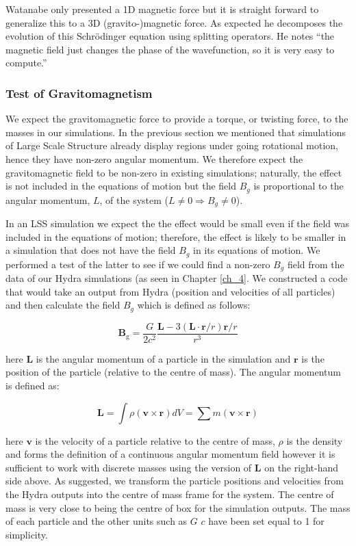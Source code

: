 Watanabe only presented a 1D magnetic force but it is straight forward to generalize this to a 3D (gravito-)magnetic force. As expected he decomposes the evolution of this Schr\"odinger equation using splitting operators. He notes ``the magnetic field just changes the phase of the wavefunction, so it is very easy to compute.''

\subsubsection{Test of Gravitomagnetism}
We expect the gravitomagnetic force to provide a torque, or twisting force, to the masses in our simulations. In the previous section we mentioned that simulations of Large Scale Structure already display regions under going rotational motion, hence they have non-zero angular momentum. We therefore expect the gravitomagnetic field to be non-zero in existing simulations; naturally, the effect is not included in the equations of motion but the field $B_g$ is proportional to the angular momentum, $L$, of the system ($L\neq 0 \Rightarrow B_g \neq 0$).

In an LSS simulation we expect the the effect would be small even if the field was included in the equations of motion; therefore, the effect is likely to be smaller in a simulation that does not have the field $B_g$ in its equations of motion. We performed a test of the latter to see if we could find a non-zero $B_g$ field from the data of our Hydra simulations (as seen in Chapter \ref{ch_4}. We constructed a code that would take an output from Hydra (position and velocities of all particles) and then calculate the field $B_g$ which is defined as follows:

\begin{equation}
\mathbf{B}_\text{g} = \frac{G }{2 c^2} \frac{\mathbf{L} - 3(\mathbf{L} \cdot \mathbf{r}/r) \mathbf{r}/r}{r^3}
\end{equation}

\noindent here $\mathbf{L}$ is the angular momentum of a particle in the simulation and $\mathbf{r}$ is the position of the particle (relative to the centre of mass). The angular momentum is defined as:

\begin{equation}
\mathbf{L} = \int \rho (\mathbf{v} \times \mathbf{r}) dV = \sum m (\mathbf{v} \times \mathbf{r})
\end{equation}

\noindent here $\mathbf{v}$ is the velocity of a particle relative to the centre of mass, $\rho$ is the density and forms the definition of a continuous angular momentum field however it is sufficient to work with discrete masses using the version of $\mathbf{L}$ on the right-hand side above. As suggested, we transform the particle positions and velocities from the Hydra outputs into the centre of mass frame for the system. The centre of mass is very close to being the centre of box for the simulation outputs. The mass of each particle and the other units such as $G$ $c$ have been set equal to 1 for simplicity.

